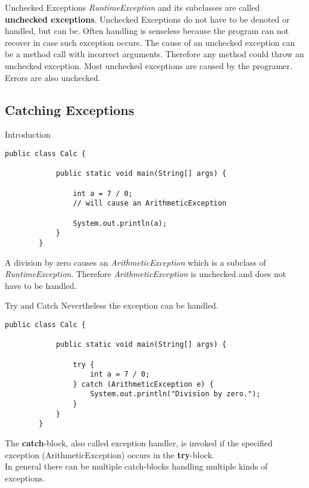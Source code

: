 \begin{frame}{Unchecked Exceptions}
	\emph{RuntimeException} and its subclasses are called \textbf{unchecked exceptions}.
	\vfill
	Unchecked Exceptions do not have to be denoted or handled, but can be.
	Often handling is senseless because the program can not recover 
	in case such exception occurs.
	\vfill
	The cause of an unchecked exception can be a method call with incorrect arguments.
	Therefore any method could throw an unchecked exception.
	Most unchecked exceptions are caused by the programer.
	\vfill
	Errors are also unchecked.
\end{frame}

\subsection{Catching Exceptions}	
\begin{frame}[fragile]{Introduction}
	\begin{lstlisting}[basicstyle=\ttfamily\scriptsize]
		public class Calc {
			
			public static void main(String[] args) {
				
				int a = 7 / 0;
				// will cause an ArithmeticException
				
				System.out.println(a);
			}
		}
	\end{lstlisting}
	A division by zero causes an \emph{ArithmeticException} which is a subclass of \emph{RuntimeException}. 
	Therefore \emph{ArithmeticException} is unchecked and does not have to be handled.
\end{frame}

\begin{frame}[fragile]{Try and Catch}
	Nevertheless the exception can be handled.
	\begin{lstlisting}[basicstyle=\ttfamily\scriptsize]
		public class Calc {
			
			public static void main(String[] args) {
				
				try {
					int a = 7 / 0;
				} catch (ArithmeticException e) {
					System.out.println("Division by zero.");
				}
			}
		}
	\end{lstlisting}
	The \textbf{catch}-block, also called exception handler,
	is invoked if the specified exception (ArithmeticException) occurs in the \textbf{try}-block.\\
	In general there can be multiple catch-blocks handling multiple kinds of exceptions.
\end{frame}

